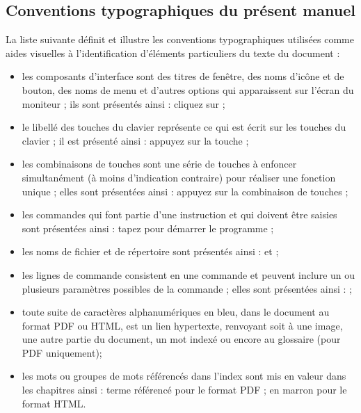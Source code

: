 \subsection{Conventions typographiques du présent manuel\label{introduction-manual-conventions}}

La liste suivante définit et illustre les conventions typographiques utilisées comme aides visuelles à l'identification d'éléments particuliers du texte du document :

\begin{itemize}
	\item les composants d'interface sont des titres de fenêtre, des noms d'icône et de bouton, des noms de menu et d'autres options qui apparaissent sur l'écran du moniteur ; ils sont présentés ainsi : \newline
\hspace*{1.5cm}cliquez sur  ;
	\item le libellé des touches du clavier représente ce qui est écrit sur les touches du clavier ; il est présenté ainsi : \newline
\hspace*{1.5cm}appuyez sur la touche  ;	
	\item les combinaisons de touches sont une série de touches à enfoncer 	simultanément (à moins d'indication contraire) pour réaliser une fonction 	unique ; elles sont présentées ainsi : \newline
\hspace*{1.5cm}appuyez sur la combinaison de touches  ;
	\item les commandes qui font partie d'une instruction et qui doivent être saisies sont présentées ainsi : \newline
\hspace*{1.5cm}tapez  pour démarrer le programme ;
	\item les noms de fichier et de répertoire sont présentés ainsi : \newline
\hspace*{1.5cm} et  ;	
	\item les lignes de commande consistent en une commande et peuvent inclure un ou plusieurs paramètres possibles de la commande ; elles sont présentées ainsi :  \newline
\hspace*{1.5cm}	 ;
	\item toute suite de caractères alphanumériques en bleu, dans le document au format \gls{PDF} ou \gls{HTML}, est un lien hypertexte, renvoyant soit à une image, une autre partie du document, un mot indexé ou encore au glossaire (pour \gls{PDF} uniquement);
	\item les mots ou groupes de mots référencés dans l'index sont mis en valeur dans les chapitres ainsi : \newline
\hspace*{1.5cm}	\textsf{terme référencé} pour le format \gls{PDF} ; \newline 
\hspace*{1.5cm} en marron pour le format \gls{HTML}. 
\end{itemize}

